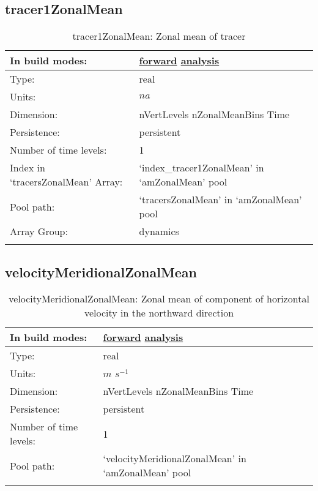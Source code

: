 \subsection[tracer1ZonalMean]{tracer1ZonalMean}
\label{subsec:var_sec_amZonalMean_tracer1ZonalMean}
\begin{center}
\begin{longtable}{| p{2.0in} | p{4.0in} |}
        \hline 
        In build modes: & \hyperref[subsec:forward_var_tab_amZonalMean]{forward} \hyperref[subsec:analysis_var_tab_amZonalMean]{analysis} \\
        \hline 
        Type: & real \\
        \hline 
        Units: & $na$ \\
        \hline 
        Dimension: & nVertLevels nZonalMeanBins Time \\
        \hline 
        Persistence: & persistent \\
        \hline 
        Number of time levels: & 1 \\
        \hline 
		 Index in `tracersZonalMean' Array: & `index\_tracer1ZonalMean' in `amZonalMean' pool \\
		 \hline 
            Pool path: & `tracersZonalMean' in `amZonalMean' pool \\
		 \hline 
		 Array Group: & dynamics \\
		 \hline 
    \caption{tracer1ZonalMean: Zonal mean of tracer}
\end{longtable}
\end{center}
\subsection[velocityMeridionalZonalMean]{velocityMeridionalZonalMean}
\label{subsec:var_sec_amZonalMean_velocityMeridionalZonalMean}
\begin{center}
\begin{longtable}{| p{2.0in} | p{4.0in} |}
        \hline 
        In build modes: & \hyperref[subsec:forward_var_tab_amZonalMean]{forward} \hyperref[subsec:analysis_var_tab_amZonalMean]{analysis} \\
        \hline 
        Type: & real \\
        \hline 
        Units: & $m$ $s^{-1}$ \\
        \hline 
        Dimension: & nVertLevels nZonalMeanBins Time \\
        \hline 
        Persistence: & persistent \\
        \hline 
        Number of time levels: & 1 \\
        \hline 
            Pool path: & `velocityMeridionalZonalMean' in `amZonalMean' pool \\
		 \hline 
    \caption{velocityMeridionalZonalMean: Zonal mean of component of horizontal velocity in the northward direction}
\end{longtable}
\end{center}
